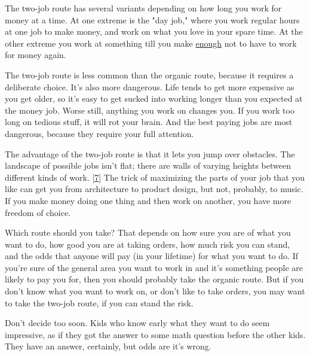 The two-job route
                  has several variants depending on how long you work for money
                  at a time. At one extreme is the "day job," where you work
                  regular hours at one job to make money, and work on what you
                  love in your spare time. At the other extreme you work at
                  something till you make \href{http://www.paulgraham.com/wealth.html}{enough} not
                  to have to work for money again.

The two-job route
                  is less common than the organic route, because it requires a
                  deliberate choice. It's also more dangerous. Life tends to get
                  more expensive as you get older, so it's easy to get sucked
                  into working longer than you expected at the money job. Worse
                  still, anything you work on changes you. If you work too long
                  on tedious stuff, it will rot your brain. And the best paying
                  jobs are most dangerous, because they require your full
                  attention.

The advantage of the two-job route is
                  that it lets you jump over obstacles. The landscape of
                  possible jobs isn't flat; there are walls of varying heights
                  between different kinds of work.
                  [\href{\#f7n}{7}]
                  The trick of maximizing the parts of your job that you like
                  can get you from architecture to product design, but not,
                  probably, to music. If you make money doing one thing and then
                  work on another, you have more freedom of choice.

Which
                  route should you take? That depends on how sure you are of
                  what you want to do, how good you are at taking orders, how
                  much risk you can stand, and the odds that anyone will pay (in
                  your lifetime) for what you want to do. If you're sure of the
                  general area you want to work in and it's something people are
                  likely to pay you for, then you should probably take the
                  organic route. But if you don't know what you want to work on,
                  or don't like to take orders, you may want to take the two-job
                  route, if you can stand the risk.

Don't decide too
                  soon. Kids who know early what they want to do seem
                  impressive, as if they got the answer to some math question
                  before the other kids. They have an answer, certainly, but
                  odds are it's wrong.


